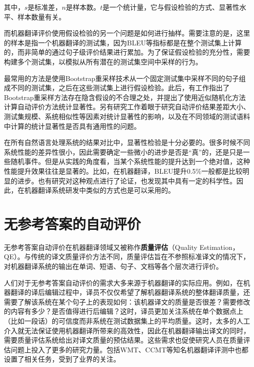 \noindent 其中，$s$是标准差，$n$是样本数。$t$是一个统计量，它与假设检验的方式、显著性水平、样本数量有关。

\parinterval 而机器翻译评价使用假设检验的另一个问题是如何进行抽样。需要注意的是，这里的样本是指一个机器翻译的测试集，因为BLEU等指标都是在整个测试集上计算的，而非简单的通过句子级评价结果进行累加。为了保证假设检验的充分性，需要构建多个测试集，以模拟从所有潜在的测试集空间中采样的行为。

\parinterval 最常用的方法是使用Bootstrap重采样技术从一个固定测试集中采样不同的句子组成不同的测试集，之后在这些测试集上进行假设检验。此后，有工作指出了Bootstrap重采样方法存在隐含假设的不合理之处，并提出了使用近似随机化方法计算自动评价方法统计显著性。另有研究工作着眼于研究自动评价结果差距大小、测试集规模、系统相似性等因素对统计显著性的影响，以及在不同领域的测试语料中计算的统计显著性是否具有通用性的问题。

\parinterval 在所有自然语言处理系统的结果对比中，显著性检验是十分必要的。很多时候不同系统性能的差异性很小，因此需要确定一些微小的进步是否是“真”的，还是只是一些随机事件。但是从实践的角度看，当某个系统性能的提升达到一个绝对值，这种性能提升效果往往是显著的。比如，在机器翻译，BLEU提升0.5$\%$一般都是比较明显的进步。也有研究对这种观点进行了论证，也发现其中具有一定的科学性。因此，在机器翻译系统研发中类似的方式也是可以采用的。


\sectionnewpage
\section{无参考答案的自动评价}

\parinterval 无参考答案自动评价在机器翻译领域又被称作{\small\sffamily\bfseries{质量评估}}（Quality Estimation，\\QE）。与传统的译文质量评价方法不同，质量评估旨在不参照标准译文的情况下，对机器翻译系统的输出在单词、短语、句子、文档等各个层次进行评价。

\parinterval 人们对于无参考答案自动评价的需求大多来源于机器翻译的实际应用。例如，在机器翻译的译后编辑过程中，译员不仅仅希望了解机器翻译系统的整体翻译质量，还需要了解该系统在某个句子上的表现如何：该机器译文的质量是否很差？需要修改的内容有多少？是否值得进行后编辑？这时，译员更加关注系统在单个数据点上（比如一段话）的可信度而非系统在测试数据集上的平均质量。这时，太多的人工介入就无法保证使用机器翻译所带来的高效性，因此在机器翻译输出译文的同时，需要质量评估系统给出对译文质量的预估结果。这些需求也促使研究人员在质量评估问题上投入了更多的研究力量。包括WMT、CCMT等知名机器翻译评测中也都设置了相关任务，受到了业界的关注。

